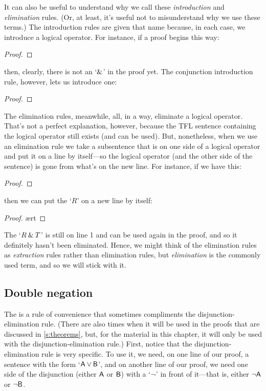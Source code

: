 It can also be useful to understand why we call these \textit{introduction} and \textit{elimination} rules. (Or, at least, it's useful not to misunderstand why we use these terms.) The introduction rules are given that name because, in each case, we introduce a logical operator. For instance, if a proof begins this way: 

\begin{proof}
	 \pr{}
	 \pr{}
\end{proof}

\noindent then, clearly, there is not an `$\mathbin{\&}$' in the proof yet. The conjunction introduction rule, however, lets us introduce one:

\begin{proof}
	 
\end{proof}

The elimination rules, meanwhile, all, in a way, eliminate a logical operator. That's not a perfect explanation, however, because the TFL sentence containing the logical operator still exists (and can be used). But, nonetheless, when we use an elimination rule we take a subsentence that is on one side of a logical operator and put it on a line by itself---so the logical operator (and the other side of the sentence) is gone from what's on the new line. For instance, if we have this:

\begin{proof}
	 \pr{}
\end{proof}

\noindent then we can put the `$R$' on a new line by itself:

\begin{proof}
	 \ae{rt}
\end{proof}

\noindent The `$R \mathbin{\&} T$' is still on line 1 and can be used again in the proof, and so it definitely hasn't been eliminated.  Hence, we might think of the elimination rules as \textit{extraction} rules rather than elimination rules, but \textit{elimination} is the commonly used term, and so we will stick with it. 


\subsection{Double negation}\label{subsection-DN}

The  is a rule of convenience that sometimes compliments the disjunction-elimination rule. (There are also times when it will be used in the proofs that are discussed in \ref{s:theorems}, but, for the material in this chapter, it will only be used with the disjunction-elimination rule.) First, notice that the disjunction-elimination rule is very specific. To use it, we need, on one line of our proof, a sentence with the form `$\mathsf{A}\vee\mathsf{B}$', and on another line of our proof, we need one side of the disjunction (either $\mathsf{A}$ or $\mathsf{B}$) with a `${\neg}$' in front of it---that is, either ${\neg}\mathsf{A}$ or ${\neg}\mathsf{B}$. 

